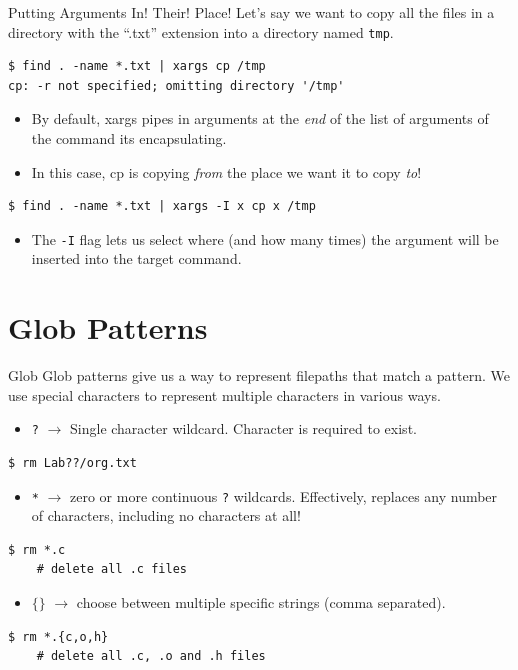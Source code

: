 \documentclass[11pt]{beamer}
\begin{document}
\begin{frame}[fragile=singleslide]{Putting Arguments In! Their! Place!}
Let's say we want to copy all the files in a directory with the ``.txt'' extension into a directory named \texttt{tmp}.
\begin{lstlisting}[style=terminal]
$ find . -name *.txt | xargs cp /tmp
cp: -r not specified; omitting directory '/tmp'
\end{lstlisting}
\begin{itemize}
\item By default, xargs pipes in arguments at the \emph{end} of the list of arguments of the command its encapsulating.
\item In this case, cp is copying \emph{from} the place we want it to copy \emph{to}!
\end{itemize}
\begin{lstlisting}[style=terminal]
$ find . -name *.txt | xargs -I x cp x /tmp
\end{lstlisting}
\begin{itemize}
\item The \texttt{-I} flag lets us select where (and how many times) the argument will be inserted into the target command.  
\end{itemize}
\end{frame}

\section[Glob]{Glob Patterns}
\begin{frame}[fragile=singleslide]{Glob}
Glob patterns give us a way to represent filepaths that match a pattern.  We use special characters to represent multiple characters in various ways.
\begin{itemize}
\item \texttt{?} $\rightarrow$ Single character wildcard.  Character is required to exist.
\end{itemize}
\begin{lstlisting}[style=terminal]
$ rm Lab??/org.txt
\end{lstlisting}
\begin{itemize}
\item \texttt{\**} $\rightarrow$ zero or more continuous \texttt{?} wildcards.  Effectively, replaces any number of characters, including no characters at all!
\end{itemize}
\begin{lstlisting}[style=terminal]
$ rm *.c 
	# delete all .c files 
\end{lstlisting}
\begin{itemize}
\item $\{\}$ $\rightarrow$ choose between multiple specific strings (comma separated).
\end{itemize}
\begin{lstlisting}[style=terminal]
$ rm *.{c,o,h}
	# delete all .c, .o and .h files
\end{lstlisting}
\end{frame}
\end{document}
